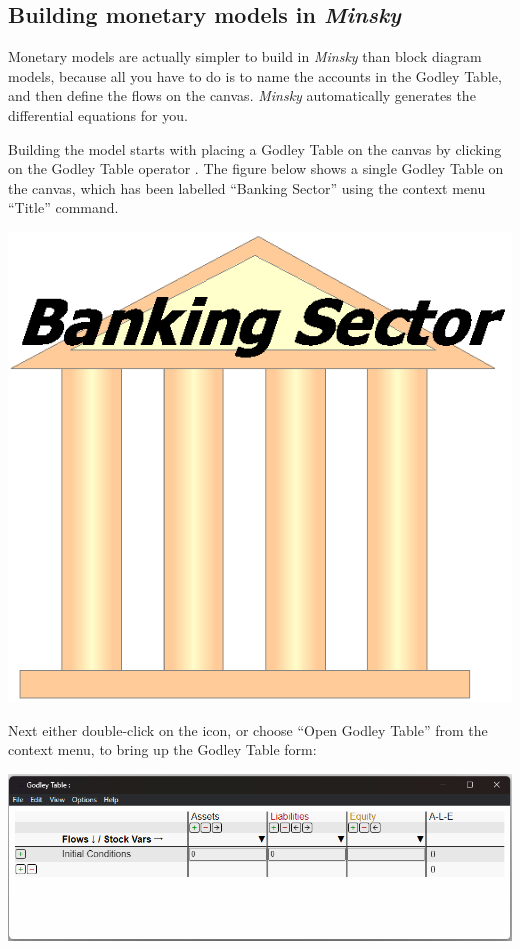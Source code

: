 \subsection{Building monetary models in \emph{Minsky}}

Monetary models are actually simpler to build in \emph{Minsky} than
block diagram models, because all you have to do is to name the accounts
in the Godley Table, and then define the flows on the canvas. \emph{Minsky}
automatically generates the differential equations for you.

Building the model starts with placing a Godley Table on the canvas
by clicking on the Godley Table operator .
The figure below shows a single Godley Table on the canvas, which
has been labelled ``Banking Sector'' using the context menu ``Title''
command.

\includegraphics{images/MonetaryModel01GodleyTable01}

Next either double-click on the icon, or choose ``Open Godley Table''
from the context menu, to bring up the Godley Table form:

\noindent\includegraphics[width=\textwidth]{images/GodleyTableEditWindow}

